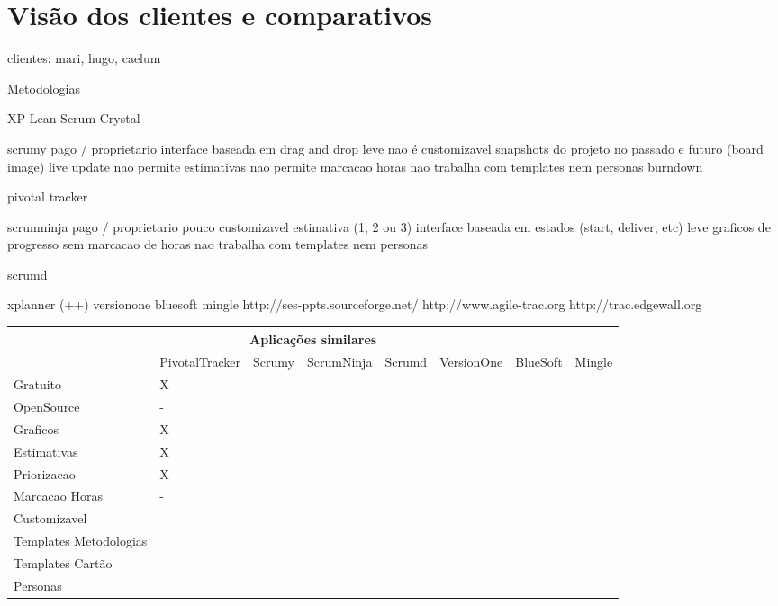 \section{Visão dos clientes e comparativos}

clientes: mari, hugo, caelum

Metodologias

XP
Lean
Scrum
Crystal


scrumy
	pago / proprietario
	interface baseada em drag and drop
	leve
	nao é customizavel
	snapshots do projeto no passado e futuro (board image)
	live update
	nao permite estimativas
	nao permite marcacao horas
	nao trabalha com templates nem personas
	burndown
	
pivotal tracker

scrumninja
	pago / proprietario
	pouco customizavel
	estimativa (1, 2 ou 3)
	interface baseada em estados (start, deliver, etc)
	leve
	graficos de progresso
	sem marcacao de horas
	nao trabalha com templates nem personas

scrumd
	
xplanner (++)
versionone
bluesoft
mingle
http://ses-ppts.sourceforge.net/
http://www.agile-trac.org
http://trac.edgewall.org


\begin{sidewaystable}
	\begin{tabular}{|l|l|l|l|l|l|l|l}
		\hline
		\multicolumn{8}{|c|}{Aplicações similares} \\
		\hline
		 & PivotalTracker & Scrumy & ScrumNinja & Scrumd & VersionOne & BlueSoft & Mingle \\
		Gratuito & X & & & & & & \\
		OpenSource & - & & & & & & \\
		Graficos & X & & & & & & \\
		Estimativas & X & & & & & & \\
		Priorizacao & X & & & & & & \\
		Marcacao Horas & - & & & & & & \\
		Customizavel & & & & & & & \\
		Templates Metodologias & & & & & & & \\
		Templates Cartão & & & & & & & \\
		Personas & & & & & & & \\
		\hline
	\end{tabular}
\end{sidewaystable}


